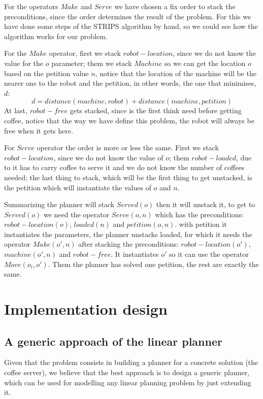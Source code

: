 \documentclass[12pt,a4paper,oneside]{article}
\numberwithin{equation}{section}
\numberwithin{equation}{section}
\theoremstyle{definition}
\begin{document}
For the operators $Make$ and $Serve$ we have chosen a fix order to stack the preconditions, since the order determines the result of the problem. For this we have done some steps of the STRIPS algorithm by hand, so we could see how the algorithm works for our problem.

For the $Make$ operator, first we stack $robot-location$, since we do not know the value for the $o$ parameter; them we stack $Machine$ so we can get the location $o$ based on the petition value $n$, notice that the location of the machine will be the nearer one to the robot and the petition, in other words, the one that minimises, $d$:
$$d = distance(machine, robot) + distance(machine, petition)$$
 At last, $robot- free$ gets stacked, since is the first think need before getting coffee, notice that the way we have define this problem, the robot will always be free when it gets here.
 
 For $Serve$ operator the order is more or less the same. First we stack $robot-location$, since we do not know the value of $o$; them $robot-loaded$, due to it has to carry coffee to serve it and we do not know the number of coffees needed; the last thing to stack, which will be the first thing to get unstacked, is the petition which will instantiate the values of $o$ and $n$.
 
 Summarizing the planner will stack $Served(o)$ then it will unstack it, to get to $Served(o)$ we need the operator $Serve(o,n)$ which has the preconditions: $robot-location(o)$, $ loaded(n) $ and $petition(o,n)$. with petition it instantiates the parameters, the planner unstacks loaded, for which it needs the operator $Make(o',n)$ after stacking the preconditions: $robot-location(o')$, $machine(o',n)$ and $robot-free$. It instantiates $o'$ so it can use the operator $Move(o_i,o')$. Them the planner has solved one petition, the rest are exactly the same.

\section{Implementation design}

\subsection{A generic approach of the linear planner}
Given that the problem consists in building a planner for a concrete solution (the coffee server), we believe that the best approach is to design a generic planner, which can be used for modelling any linear planning problem by just extending it.
\end{document}
